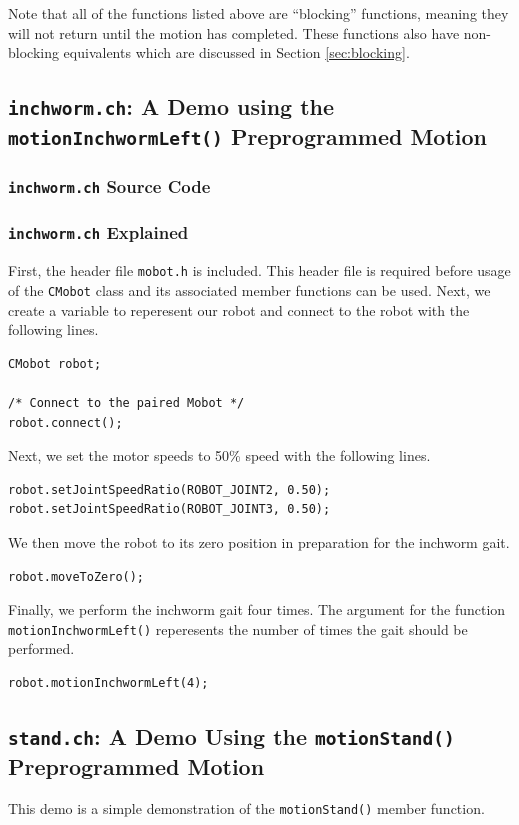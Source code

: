 \documentclass{article}
\begin{document}
Note that all of the functions listed above are ``blocking'' functions, meaning
they will not return until the motion has completed. These functions also
have non-blocking equivalents which are discussed in Section
\ref{sec:blocking}.

\subsection{\texttt{inchworm.ch}: A Demo using the \texttt{motionInchwormLeft()}
Preprogrammed Motion}
\subsubsection{\texttt{inchworm.ch} Source Code}

\subsubsection{\texttt{inchworm.ch} Explained}
First, the header file \texttt{mobot.h} is included. This header file
is required before usage of the \texttt{CMobot} class and its associated
member functions can be used. Next, we create a variable to reperesent our
robot and connect to the robot with the following lines.
\begin{verbatim}
CMobot robot;

/* Connect to the paired Mobot */
robot.connect();
\end{verbatim}

Next, we set the motor speeds to 50\% speed with the following lines.
\begin{verbatim}
robot.setJointSpeedRatio(ROBOT_JOINT2, 0.50);
robot.setJointSpeedRatio(ROBOT_JOINT3, 0.50);
\end{verbatim}

We then move the robot to its zero position in preparation for the 
inchworm gait.
\begin{verbatim}
robot.moveToZero();
\end{verbatim}

Finally, we perform the inchworm gait four times. The argument for the
function \texttt{motionInchwormLeft()} reperesents the number of times
the gait should be performed.
\begin{verbatim}
robot.motionInchwormLeft(4);
\end{verbatim}


\subsection{\texttt{stand.ch}: A Demo Using the \texttt{motionStand()} Preprogrammed
Motion}
This demo is a simple demonstration of the \texttt{motionStand()} member function.
\end{document}
